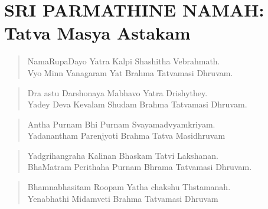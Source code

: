 \begin{verse}
\end{verse}

\begin{verse}
\end{verse}

\begin{center}
\end{center}

\delimiter

\chapter*{SRI PARMATHINE NAMAH:\\ Tatva Masya Astakam}

\begin{verse}
 NamaRupaDayo Yatra Kalpi Shashitha Vebrahmath.\\
 Vyo Minn Vanagaram Yat Brahma Tatvamasi Dhruvam.
\end{verse}

\begin{verse}
 Dra astu Darshonaya Mabhavo Yatra Drishythey.\\
 Yadey Deva Kevalam Shudam Brahma Tatvamasi Dhruvam.
\end{verse}

\begin{verse}
 Antha Purnam Bhi Purnam Svayamadvyamkriyam.\\
 Yadanantham Parenjyoti Brahma Tatva Masidhruvam
\end{verse}

\begin{verse}
 Yadgrihangraha Kalinan Bhaskam Tatvi Lakshanan.\\
 BhaMatram Perithaha Purnam Bhrama Tatvamasi Dhruvam.
\end{verse}

\begin{verse}
 Bhamnabhasitam Roopam Yatha chakshu Thstamanah.\\
 Yenabhathi Midamveti Brahma Tatvamasi Dhruvam
\end{verse}

